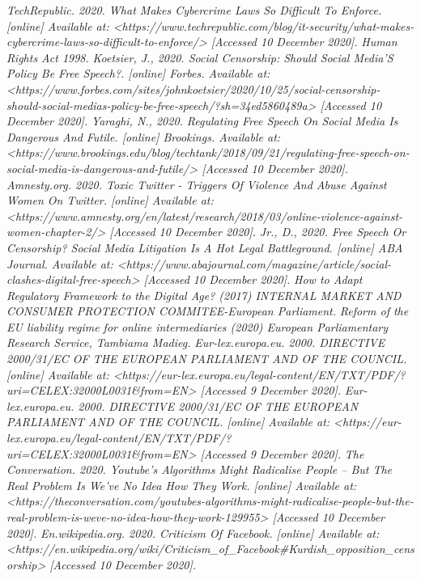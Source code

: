 \documentclass[openany]{article}
\begin{document}
\begin{thebibliography}{1}
			\textit{TechRepublic. 2020. What Makes Cybercrime Laws So Difficult To Enforce. [online] Available at: <https://www.techrepublic.com/blog/it-security/what-makes-cybercrime-laws-so-difficult-to-enforce/> [Accessed 10 December 2020].}			
			\textit{Human Rights Act 1998.}			
			\textit{Koetsier, J., 2020. Social Censorship: Should Social Media’S Policy Be Free Speech?. [online] Forbes. Available at: <https://www.forbes.com/sites/johnkoetsier/2020/10/25/social-censorship-should-social-medias-policy-be-free-speech/?sh=34ed5860489a> [Accessed 10 December 2020].}
			\textit{Yaraghi, N., 2020. Regulating Free Speech On Social Media Is Dangerous And Futile. [online] Brookings. Available at: <https://www.brookings.edu/blog/techtank/2018/09/21/regulating-free-speech-on-social-media-is-dangerous-and-futile/> [Accessed 10 December 2020].}
			\textit{Amnesty.org. 2020. Toxic Twitter - Triggers Of Violence And Abuse Against Women On Twitter. [online] Available at: <https://www.amnesty.org/en/latest/research/2018/03/online-violence-against-women-chapter-2/> [Accessed 10 December 2020].}
			\textit{Jr., D., 2020. Free Speech Or Censorship? Social Media Litigation Is A Hot Legal Battleground. [online] ABA Journal. Available at: <https://www.abajournal.com/magazine/article/social-clashes-digital-free-speech> [Accessed 10 December 2020].}
			\textit{How to Adapt Regulatory Framework to the Digital Age?  (2017) INTERNAL MARKET AND CONSUMER PROTECTION COMMITEE-European Parliament.}
			\textit{Reform of the EU liability regime for online intermediaries (2020) European Parliamentary Research Service, Tambiama Madieg.}
			\textit{Eur-lex.europa.eu. 2000. DIRECTIVE 2000/31/EC OF THE EUROPEAN PARLIAMENT AND OF THE COUNCIL. [online] Available at: <https://eur-lex.europa.eu/legal-content/EN/TXT/PDF/?uri=CELEX:32000L0031\&from=EN> [Accessed 9 December 2020].}
			\textit{Eur-lex.europa.eu. 2000. DIRECTIVE 2000/31/EC OF THE EUROPEAN PARLIAMENT AND OF THE COUNCIL. [online] Available at: <https://eur-lex.europa.eu/legal-content/EN/TXT/PDF/?uri=CELEX:32000L0031\&from=EN> [Accessed 9 December 2020].}
			\textit{The Conversation. 2020. Youtube's Algorithms Might Radicalise People – But The Real Problem Is We've No Idea How They Work. [online] Available at: <https://theconversation.com/youtubes-algorithms-might-radicalise-people-but-the-real-problem-is-weve-no-idea-how-they-work-129955> [Accessed 10 December 2020].}
			\textit{En.wikipedia.org. 2020. Criticism Of Facebook. [online] Available at: <https://en.wikipedia.org/wiki/Criticism\_of\_Facebook\#Kurdish\_opposition\_censorship> [Accessed 10 December 2020].}
			
		\end{thebibliography}
\end{document}

